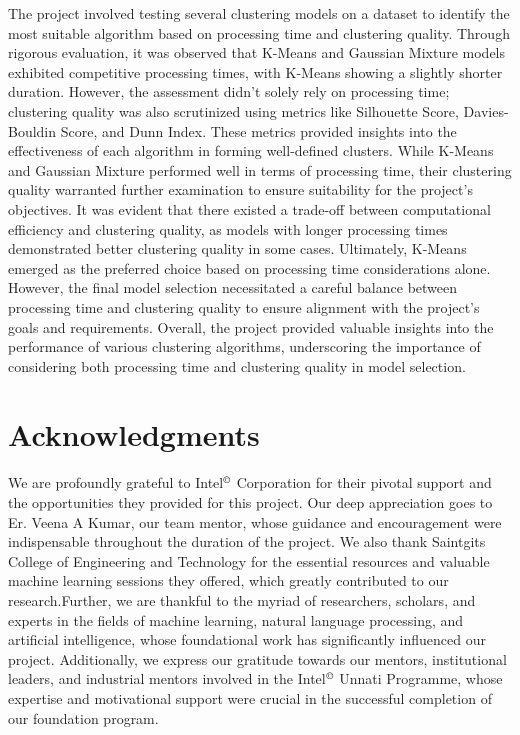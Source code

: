 \documentclass{josis}
\begin{document}
The project involved testing several clustering models on a dataset to identify the most suitable algorithm based on processing time and clustering quality. Through rigorous evaluation, it was observed that K-Means and Gaussian Mixture models exhibited competitive processing times, with K-Means showing a slightly shorter duration. However, the assessment didn't solely rely on processing time; clustering quality was also scrutinized using metrics like Silhouette Score, Davies-Bouldin Score, and Dunn Index. These metrics provided insights into the effectiveness of each algorithm in forming well-defined clusters. While K-Means and Gaussian Mixture performed well in terms of processing time, their clustering quality warranted further examination to ensure suitability for the project's objectives. It was evident that there existed a trade-off between computational efficiency and clustering quality, as models with longer processing times demonstrated better clustering quality in some cases. Ultimately, K-Means emerged as the preferred choice based on processing time considerations alone. However, the final model selection necessitated a careful balance between processing time and clustering quality to ensure alignment with the project's goals and requirements. Overall, the project provided valuable insights into the performance of various clustering algorithms, underscoring the importance of considering both processing time and clustering quality in model selection. 
\section{Acknowledgments}
We are profoundly grateful to Intel$^\copyright$ Corporation for their pivotal support and the opportunities they provided for this project. Our deep appreciation goes to Er. Veena A Kumar, our team mentor, whose guidance and encouragement were indispensable throughout the duration of the project. We also thank Saintgits College of Engineering and Technology for the essential resources and valuable machine learning sessions they offered, which greatly contributed to our research.Further, we are thankful to the myriad of researchers, scholars, and experts in the fields of machine learning, natural language processing, and artificial intelligence, whose foundational work has significantly influenced our project. Additionally, we express our gratitude towards our mentors, institutional leaders, and industrial mentors involved in the Intel$^\copyright$ Unnati Programme, whose expertise and motivational support were crucial in the successful completion of our foundation program.



\cite{*}
\end{document}
